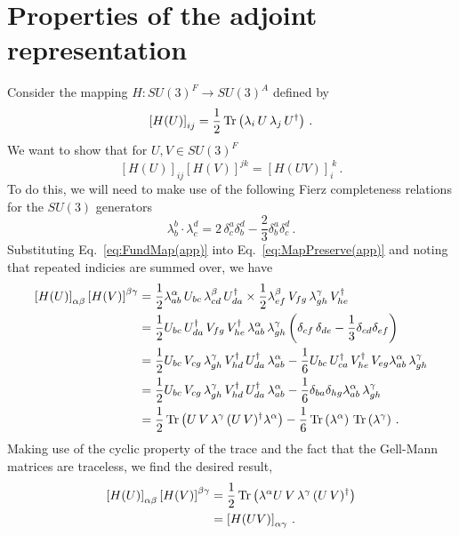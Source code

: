 \section{Properties of the adjoint representation}
\label{app:RepMapProof}
Consider the mapping $H:SU(3)^F\rightarrow SU(3)^A$ defined by
%
\begin{equation}
\left[H(U)\right]_{ij} = \frac{1}{2}\operatorname{Tr}\left(\lambda_i \, U \, \lambda_j\, U^\dagger\right)\, .
\label{eq:FundMap(app)}
\end{equation}
%
We want to show that for $U,V\in SU(3)^F$
%
\begin{equation}
\left[H(U)\right]_{ij}\left[H(V)\right]^{jk} = \left[H(U V)\right]_i^{~k}\, .
\label{eq:MapPreserve(app)}
\end{equation}
%
To do this, we will need to make use of the following Fierz completeness relations for the $SU(3)$  generators
%
\begin{equation}
\lambda _ { b } ^ { b } \cdot \lambda _ { c } ^ { d } = 2\, \delta _ { c } ^ { a } \delta _ { b } ^ { d } - \frac { 2 } { 3 } \delta _ { b } ^ { a } \delta _ { c } ^ { d }\, .
\end{equation}
%
Substituting Eq.~\ref{eq:FundMap(app)} into Eq.~\ref{eq:MapPreserve(app)} and noting that repeated indicies are summed over, we have
\begin{align*}
\left[H(U)\right]_{\alpha\beta}\left[H(V)\right]^{\beta\gamma} &= \frac{1}{2} \lambda^\alpha_{ab}\, U_{bc}\,\lambda^\beta_{cd}\, U^\dagger_{da} \times \frac{1}{2} \lambda^\beta_{ef}\, V_{fg}\,\lambda^\gamma_{gh}\, V^\dagger_{he}\\
&=\frac{1}{2} U_{bc}\,U^\dagger_{da}\,V_{fg}\,V^\dagger_{he}\,\lambda^\alpha_{ab}\, \lambda^\gamma_{gh} \left(\delta_{cf}\,\delta_{de} - \frac{1}{3}\delta_{cd}\delta_{ef}\right)\\
&=\frac{1}{2}U_{bc} \, V_{cg} \, \lambda^\gamma_{gh} \, V^\dagger_{hd} \, U^\dagger_{da} \, \lambda^\alpha_{ab} - \frac{1}{6} U_{bc} \, U^\dagger_{ca} \, V^\dagger_{he} \, V_{eg} \lambda^\alpha_{ab}\, \lambda^\gamma_{gh}\\
&= \frac{1}{2}U_{bc} \, V_{cg} \, \lambda^\gamma_{gh} \, V^\dagger_{hd} \, U^\dagger_{da} \, \lambda^\alpha_{ab} - \frac{1}{6}\delta_{ba}\delta_{hg} \lambda^\alpha_{ab}\, \lambda^\gamma_{gh}\\
&=\frac{1}{2}\operatorname{Tr}\left(U \, V \, \lambda^\gamma \, (U \, V)^\dagger \lambda^\alpha\right) - \frac{1}{6}\operatorname{Tr}\left(\lambda^\alpha\right) \, \operatorname{Tr}\left(\lambda^\gamma\right)\, .
\end{align*}
Making use of the cyclic property of the trace and the fact that the Gell-Mann matrices are traceless, we find the desired result,
%
\begin{align*}
\left[H(U)\right]_{\alpha\beta}\left[H(V)\right]^{\beta\gamma} &= \frac{1}{2}\operatorname{Tr}\left(\lambda^\alpha U \, V \, \lambda^\gamma \, (U \, V)^\dagger \right)\\
&= \left[H(UV)\right]_{\alpha\gamma} \, .
\end{align*}\\

